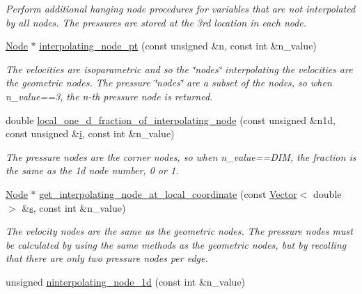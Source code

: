\begin{DoxyCompactItemize}
\begin{DoxyCompactList}\small\item\em Perform additional hanging node procedures for variables that are not interpolated by all nodes. The pressures are stored at the 3rd location in each node. \end{DoxyCompactList}\item 
\hyperlink{classoomph_1_1Node}{Node} $\ast$ \hyperlink{classoomph_1_1RefineableQSphericalTaylorHoodElement_a9c7304678e11298ff3a1d9ead5ea9675}{interpolating\+\_\+node\+\_\+pt} (const unsigned \&n, const int \&n\+\_\+value)
\begin{DoxyCompactList}\small\item\em The velocities are isoparametric and so the \char`\"{}nodes\char`\"{} interpolating the velocities are the geometric nodes. The pressure \char`\"{}nodes\char`\"{} are a subset of the nodes, so when n\+\_\+value==3, the n-\/th pressure node is returned. \end{DoxyCompactList}\item 
double \hyperlink{classoomph_1_1RefineableQSphericalTaylorHoodElement_aadbbd7d1a8aa8170490d81b6f9602ed0}{local\+\_\+one\+\_\+d\+\_\+fraction\+\_\+of\+\_\+interpolating\+\_\+node} (const unsigned \&n1d, const unsigned \&\hyperlink{cfortran_8h_adb50e893b86b3e55e751a42eab3cba82}{i}, const int \&n\+\_\+value)
\begin{DoxyCompactList}\small\item\em The pressure nodes are the corner nodes, so when n\+\_\+value==D\+IM, the fraction is the same as the 1d node number, 0 or 1. \end{DoxyCompactList}\item 
\hyperlink{classoomph_1_1Node}{Node} $\ast$ \hyperlink{classoomph_1_1RefineableQSphericalTaylorHoodElement_a0308ea44ae80a2e6bbb2453ee12482a2}{get\+\_\+interpolating\+\_\+node\+\_\+at\+\_\+local\+\_\+coordinate} (const \hyperlink{classoomph_1_1Vector}{Vector}$<$ double $>$ \&\hyperlink{cfortran_8h_ab7123126e4885ef647dd9c6e3807a21c}{s}, const int \&n\+\_\+value)
\begin{DoxyCompactList}\small\item\em The velocity nodes are the same as the geometric nodes. The pressure nodes must be calculated by using the same methods as the geometric nodes, but by recalling that there are only two pressure nodes per edge. \end{DoxyCompactList}\item 
unsigned \hyperlink{classoomph_1_1RefineableQSphericalTaylorHoodElement_aa722413e544ba7dc9fcd8c42ceb2060d}{ninterpolating\+\_\+node\+\_\+1d} (const int \&n\+\_\+value)

\end{DoxyCompactItemize}
